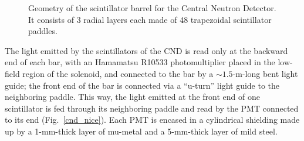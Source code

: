 \documentclass[12pt]{article}
\begin{document}
\begin{figure}
\begin{center}
\centering
{}
\caption {Geometry of the scintillator barrel for the Central Neutron Detector. It consists of 3 radial layers each made of 48 trapezoidal scintillator paddles.}
\label{geom_scint}
\end{center}
\end{figure}

The light emitted by the scintillators of the CND is read only at the backward end of each bar, with an Hamamatsu R10533 photomultiplier placed in the low-field region of the solenoid, and connected to the bar by a $\sim 1.5$-m-long bent light guide; the front end of the bar is connected via a ``u-turn'' light guide to the neighboring paddle. This way, the light emitted at the front end of one scintillator is fed through its neighboring paddle and read by the PMT connected to its end (Fig.~\ref{cnd_nice}). Each PMT is encased in a cylindrical shielding made up by a 1-mm-thick layer of mu-metal and a 5-mm-thick layer of mild steel. 
\end{document}
